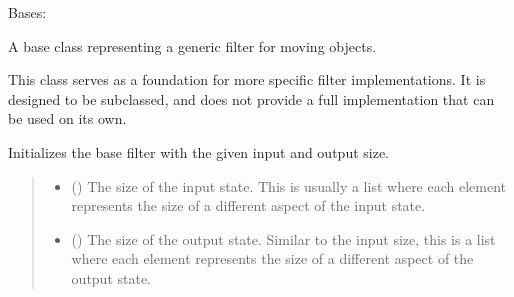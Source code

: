 \documentclass[letterpaper,10pt,english]{sphinxmanual}
\begin{document}
\begin{fulllineitems}
\label{\detokenize{generated/eflatun_uav.filters:eflatun_uav.filters.BaseFilter}}
\pysigstartsignatures
{}
\pysigstopsignatures
\sphinxAtStartPar
Bases: 

\sphinxAtStartPar
A base class representing a generic filter for moving objects.

\sphinxAtStartPar
This class serves as a foundation for more specific filter implementations. It is designed to be
subclassed, and does not provide a full implementation that can be used on its own.

\begin{fulllineitems}
\label{\detokenize{generated/eflatun_uav.filters:eflatun_uav.filters.BaseFilter.__init__}}
\pysigstartsignatures
{}
\pysigstopsignatures
\sphinxAtStartPar
Initializes the base filter with the given input and output size.
\begin{quote}\begin{description}
\begin{itemize}
\item {} 
\sphinxAtStartPar
{} () \textendash{} The size of the input state. This is usually a list where each element represents
the size of a different aspect of the input state.

\item {} 
\sphinxAtStartPar
{} () \textendash{} The size of the output state. Similar to the input size, this is a list where each
element represents the size of a different aspect of the output state.


\end{itemize}
\end{description}
\end{quote}
\end{fulllineitems}
\end{fulllineitems}
\end{document}
